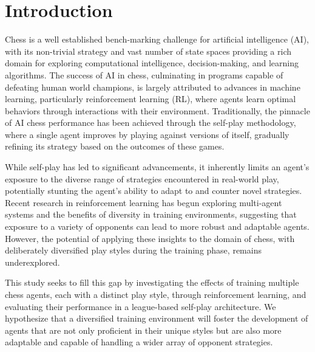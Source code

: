 \documentclass[journal]{IEEEtran}
\begin{document}
	\section{Introduction}
	\label{sec:introduction}
	Chess is a well established bench-marking challenge for artificial intelligence (AI),
	with its non-trivial strategy and vast number of state spaces providing a rich domain for exploring 
	computational intelligence, decision-making, and learning algorithms. 
	The success of AI in chess, culminating in programs capable of defeating human world champions, 
	is largely attributed to advances in machine learning, particularly reinforcement learning (RL), 
	where agents learn optimal behaviors through interactions with their environment. 
	Traditionally, the pinnacle of AI chess performance has been achieved through the self-play methodology, 
	where a single agent improves by playing against versions of itself, gradually refining its strategy based on the outcomes of these games.
	
	While self-play has led to significant advancements, it inherently limits an agent's exposure to the diverse range of strategies 
	encountered in real-world play, potentially stunting the agent's ability to adapt to and counter novel strategies. 
	Recent research in reinforcement learning has begun exploring multi-agent systems and the benefits of diversity in training environments, 
	suggesting that exposure to a variety of opponents can lead to more robust and adaptable agents. 
	However, the potential of applying these insights to the domain of chess, 
	with deliberately diversified play styles during the training phase, remains underexplored.
		
	This study seeks to fill this gap by investigating the effects of training multiple chess agents, each with a distinct play style, 
	through reinforcement learning, and evaluating their performance in a league-based self-play architecture. 
	We hypothesize that a diversified training environment will foster the development of agents that are not only 
	proficient in their unique styles but are also more adaptable and capable of handling a wider array of opponent strategies. 
		
\end{document}
